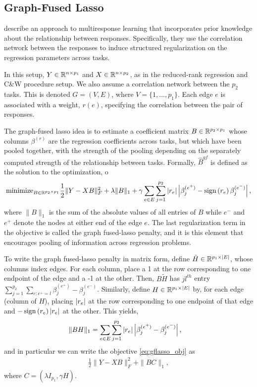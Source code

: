 \documentclass{article}
\begin{document}
\subsection{Graph-Fused Lasso}
\label{subsec:graph_fused_lasso}

\citep{chen2010graph} describe an approach to multiresponse learning that
incorporates prior knowledge about the relationship between responses.
Specifically, they use the correlation network between the responses to induce
structured regularization on the regression parameters across tasks.

In this setup, $Y \in \mathbb{R}^{n \times p_{1}}$ and $X \in \mathbb{R}^{n \times
  p_{2}}$, as in the reduced-rank regression and C\&W procedure setup. We also
assume a correlation network between the $p_{2}$ tasks. This is denoted $G =
\left(V, E\right)$, where $V = \{1, \dots, p_{1}\}$. Each edge $e$ is associated
with a weight, $r\left(e\right)$, specifying the correlation between the pair of
responses.

The graph-fused lasso idea is to estimate a coefficient matrix $B \in
\mathbb{R}^{p_{2} \times p_{1}}$ whose columns $\beta^{(r)}$ are the regression
coefficients across tasks, but which have been pooled together, with the
strength of the pooling depending on the separately computed strength of the
relationship between tasks. Formally, $\hat{B}^{gf}$ is defined as the solution
to the optimization,
o\begin{align}
\text{minimize}_{B \in \mathbb{R}^{p_{2} \times p_{1}}} \frac{1}{2}\|Y -
  XB\|_{F}^{2} + \lambda \|B\|_{1} + \gamma \sum_{e \in E} \sum_{j =
    1}^{p_{2}} \left|r_{e}\right|\left|\beta_{j}^{(e^{+})} -
      \mathop\mathrm{sign}\left(r_{e}\right) \beta^{(e^{-})}_{j}\right|, \label{eq:gflasso_obj}
\end{align}
where $\|B\|_{1}$ is the sum of the absolute values of all entries of $B$ while
$e^{-}$ and $e^{+}$ denote the nodes at either end of the edge $e$. The last
regularization term in the objective is called the graph fused-lasso penalty,
and it is this element that encourages pooling of information across regression
problems.

To write the graph fused-lasso penalty in matrix form, define $\tilde{H} \in
\mathbb{R}^{p_{1} \times \left|E\right|}$, whose columns index edges. For each column,
place a 1 at the row corresponding to one endpoint of the edge and a -1 at the
other. Then, $B\tilde{H}$ has $jl^{th}$ entry $\sum_{j = 1}^{p_{2}} \sum_{e :
  e^{+} = l}\beta_{j}^{(e^{+})} - \beta_{j}^{(e^{-})}$. Similarly, define $H \in
\mathbb{R}^{p_{1} \times \left|E\right|}$ by, for each edge (column of $H$), placing
$\left|r_{e}\right|$ at the row corresponding to one endpoint of that edge and
$-\mathop\mathrm{sign}\left(r_{e}\right)\left|r_{e}\right|$ at the other. This yields,
\begin{align*}
\|BH\|_{1} &= \sum_{e \in E}\sum_{j = 1}^{p_{2}}
\left|r_{e}\right|\left|\beta_{j}^{(e^{+})} - \beta_{j}^{(e^{-})}\right|,
\end{align*}
and in particular we can write the objective \ref{eq:gflasso_obj} as
\begin{align}
  \frac{1}{2}\|Y - XB\|_{F}^{2} + \|BC\|_{1}, \label{eq:gflasso_reform}
\end{align}
where $C = \left(\lambda I_{p_{1}}, \gamma H\right)$.
\end{document}

